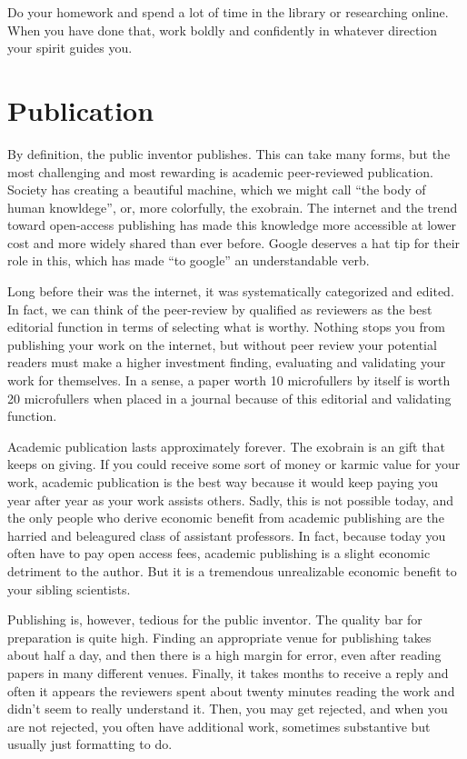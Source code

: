 \documentclass[
	fontsize=10pt, %
	twoside=false, %
	secnumdepth=1, %
]{kaobook}
\begin{document}
Do your homework and spend a lot of time in the library or researching
online. When you have done that, work boldly and confidently in
whatever direction your spirit guides you.

\section{Publication}

By definition, the public inventor publishes.
This can take many forms, but the most challenging and most rewarding
is academic peer-reviewed publication.
Society has creating a beautiful machine, which we might
call ``the body of human knowldege'', or, more colorfully, the exobrain.
The internet and the trend toward open-access publishing has made this
knowledge more accessible at lower cost and more widely shared
than ever before.
Google deserves a hat tip for their role in this, which has made
``to google'' an understandable verb.

Long before their was the internet, it was systematically categorized
and edited. In fact, we can think of the peer-review by qualified as
reviewers as the best editorial function in terms of selecting what
is worthy.
Nothing stops you from publishing your work on the internet, but
without peer review your potential readers must make a higher investment
finding, evaluating and validating your work for themselves.
In a sense, a paper worth 10 microfullers by itself is worth
20 microfullers when placed in a journal because of this
editorial and validating function.

Academic publication lasts approximately forever.
The exobrain is an gift that keeps on giving.
If you could receive some sort of money or karmic value
for your work, academic publication is the best way
because it would keep paying you year after year as
your work assists others. Sadly, this is not possible
today, and the only people who derive economic benefit
from academic publishing are the harried and beleagured class of assistant professors.
In fact, because today you often have to pay open access fees, academic
publishing is a slight economic detriment to the author.
But it is a tremendous unrealizable economic benefit to your
sibling scientists.

Publishing is, however, tedious for the public inventor.
The quality bar for preparation is quite high.
Finding an appropriate venue for publishing takes about half a day, and
then there is a high margin for error, even after reading papers in many
different venues.
Finally, it takes months to receive a reply and often it appears
the reviewers spent about twenty minutes reading the work and didn't seem
to really understand it.
Then, you may get rejected, and when you are not rejected, you often
have additional work, sometimes substantive but usually just formatting to do.
\end{document}
